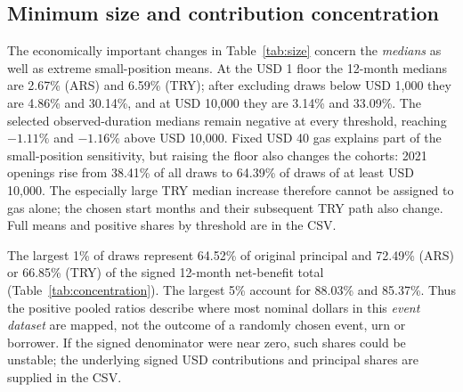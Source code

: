 \documentclass[sn-vancouver,Numbered]{sn-jnl}
\begin{document}
\subsection{Minimum size and contribution concentration}
\begin{table}[t]
\caption{Effect of minimum draw size on hypothetical net benefits, under the same cost assumptions as Table~\ref{tab:main}. Observed rows use selected clean, repaid spell durations and daily FX marks; 12-month rows use the monthly OECD/FRED scenario. Weighted net is the sum of signed USD benefits divided by principal within each row.}
\label{tab:size}\centering\scriptsize

\end{table}
The economically important changes in Table~\ref{tab:size} concern the \emph{medians} as well as extreme small-position means. At the USD 1 floor the 12-month medians are 2.67\% (ARS) and 6.59\% (TRY); after excluding draws below USD 1,000 they are 4.86\% and 30.14\%, and at USD 10,000 they are 3.14\% and 33.09\%. The selected observed-duration medians remain negative at every threshold, reaching $-1.11\%$ and $-1.16\%$ above USD 10,000. Fixed USD 40 gas explains part of the small-position sensitivity, but raising the floor also changes the cohorts: 2021 openings rise from 38.41\% of all draws to 64.39\% of draws of at least USD 10,000. The especially large TRY median increase therefore cannot be assigned to gas alone; the chosen start months and their subsequent TRY path also change. Full means and positive shares by threshold are in the CSV.
\begin{table}[t]
\caption{Concentration of hypothetical 12-month net benefit among the largest draw events, ranked by original principal. Share of signed net is the top group's sum of net USD benefit divided by the full sample's signed net USD benefit. All entries are percentages, not event probabilities.}
\label{tab:concentration}\centering\small

\end{table}
The largest 1\% of draws represent 64.52\% of original principal and 72.49\% (ARS) or 66.85\% (TRY) of the signed 12-month net-benefit total (Table~\ref{tab:concentration}). The largest 5\% account for 88.03\% and 85.37\%. Thus the positive pooled ratios describe where most nominal dollars in this \emph{event dataset} are mapped, not the outcome of a randomly chosen event, urn or borrower. If the signed denominator were near zero, such shares could be unstable; the underlying signed USD contributions and principal shares are supplied in the CSV.
\end{document}
